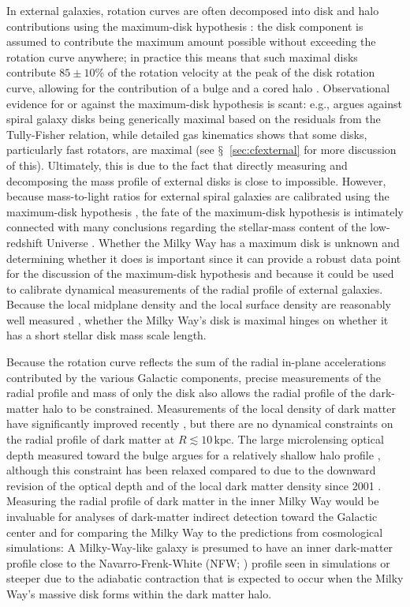 \documentclass{emulateapj}
\newcommand{\eg}{e.g.}
\newcommand{\sectionname}{$\mathsection$}
\newcommand{\kpc}{\ensuremath{\,\mathrm{kpc}}}
\begin{document}
In external galaxies, rotation curves are often decomposed into disk
and halo contributions using the maximum-disk hypothesis
\citep{vanAlbada86a}: the disk component is assumed to contribute the
maximum amount possible without exceeding the rotation curve anywhere;
in practice this means that such maximal disks contribute $85\pm10\%$
of the rotation velocity at the peak of the disk rotation curve,
allowing for the contribution of a bulge and a cored halo
\citep{Sackett97a}. Observational evidence for or against the
maximum-disk hypothesis is scant: \eg, \citet{Courteau99a} argues
against spiral galaxy disks being generically maximal based on the
residuals from the Tully-Fisher relation, while detailed gas
kinematics shows that some disks, particularly fast rotators, are
maximal \citep[\eg,][]{Weiner01a,Kranz03a} (see
\sectionname~\ref{sec:cfexternal} for more discussion of
this). Ultimately, this is due to the fact that directly measuring and
decomposing the mass profile of external disks is close to
impossible. However, because mass-to-light ratios for external spiral
galaxies are calibrated using the maximum-disk hypothesis
\citep[\eg,][]{Bell01a}, the fate of the maximum-disk hypothesis is
intimately connected with many conclusions regarding the stellar-mass
content of the low-redshift Universe
\citep[\eg,][]{Bell03a,Li09a}. Whether the Milky Way has a maximum
disk is unknown \citep{Sackett97a} and determining whether it does is
important since it can provide a robust data point for the discussion
of the maximum-disk hypothesis and because it could be used to
calibrate dynamical measurements of the radial profile of external
galaxies. Because the local midplane density and the local surface
density are reasonably well measured
\citep[\eg,][]{Kuijken89b,Holmberg00a}, whether the Milky Way's disk
is maximal hinges on whether it has a short stellar disk mass scale
length.

Because the rotation curve reflects the sum of the radial in-plane
accelerations contributed by the various Galactic components, precise
measurements of the radial profile and mass of only the disk also
allows the radial profile of the dark-matter halo to be
constrained. Measurements of the local density of dark matter have
significantly improved recently \citep{BovyTremaine,Zhang13a}, but
there are no dynamical constraints on the radial profile of dark
matter at $R \lesssim10\kpc$. The large microlensing optical depth
measured toward the bulge argues for a relatively shallow halo profile
\citep{Binney01a}, although this constraint has been relaxed compared
to \citet{Binney01a} due to the downward revision of the optical depth
\citep[\eg,][]{Popowski05a} and of the local dark matter density since
2001 \citep{BovyTremaine,Zhang13a}. Measuring the radial profile of
dark matter in the inner Milky Way would be invaluable for analyses of
dark-matter indirect detection toward the Galactic center and for
comparing the Milky Way to the predictions from cosmological
simulations: A Milky-Way-like galaxy is presumed to have an inner
dark-matter profile close to the Navarro-Frenk-White (NFW;
\citealt{Navarro97a}) profile seen in simulations or steeper due to
the adiabatic contraction that is expected to occur when the Milky
Way's massive disk forms within the dark matter halo.
\end{document}
